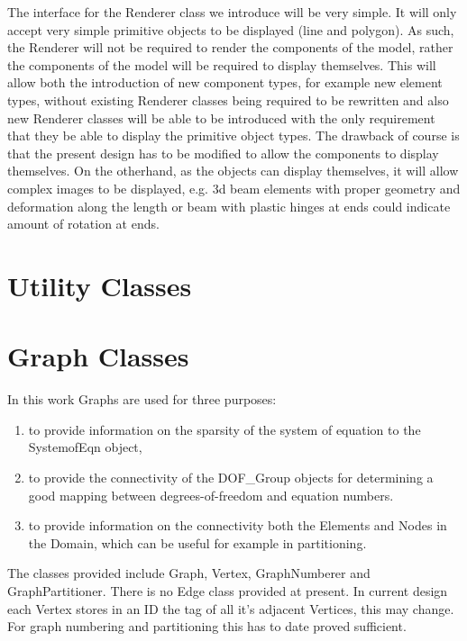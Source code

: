 The interface for the Renderer class we introduce will be very
simple. It will only accept very simple primitive objects to be
displayed (line and polygon). As such, the Renderer will not be
required to render the components of the model, rather the components
of the model will be required to display themselves. This will allow
both the introduction of new component types, for example new element
types, without existing Renderer classes being required to be
rewritten and also new Renderer classes will be able to be introduced
with the only requirement that they be able to display the primitive
object types. The drawback of course is that the present design has to
be modified to allow the components to display themselves. On the
otherhand, as the objects can display themselves, it will allow
complex images to be displayed, e.g. 3d beam elements with proper
geometry and deformation along the length or beam with plastic hinges
at ends could indicate amount of rotation at ends. 

\pagebreak 
\pagebreak

\pagebreak
\section{Utility Classes}
\pagebreak 
\pagebreak 
\pagebreak 


\pagebreak
\section{Graph Classes}
In this work Graphs are used for three purposes: \begin{enumerate} 
\item to provide information on the sparsity of the system of equation 
to the SystemofEqn object, 
\item to provide the connectivity of the DOF\_Group objects for determining
a good mapping between degrees-of-freedom and equation numbers.
\item to provide information on the connectivity both the Elements and Nodes
in the Domain, which can be useful for example in partitioning.
\end{enumerate}

The classes provided include Graph, Vertex, GraphNumberer and 
GraphPartitioner. There is no Edge class provided at present. In current 
design each Vertex stores in an ID the tag of all it's adjacent Vertices, 
this may change. For graph numbering and partitioning this has to date 
proved sufficient.

